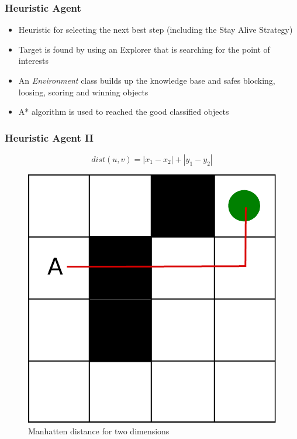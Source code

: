 \documentclass{beamer}
\begin{document}
\begin{frame}
\frametitle{Heuristic Agent}
\begin{itemize}
\item Heuristic for selecting the next best step (including the Stay Alive Strategy)
\item Target is found by using an Explorer that is searching for
the point of interests

\item An \textit{Environment} class builds up the knowledge base and safes
blocking, loosing, scoring and winning objects

\item A* algorithm is used to reached the good classified objects

\end{itemize}

\end{frame}



\begin{frame}
\frametitle{Heuristic Agent II}
\begin{equation}
dist(u,v) = |x_{1} - x_{2}| + |y_{1} - y_{2}|
\end{equation}
\begin{figure}
\centering
\includegraphics[scale=0.3]{../report/images/manhatten.pdf}
\caption{Manhatten distance for two dimensions}
\label{fig:manhatten}
\end{figure}
\end{frame}
\end{document}

